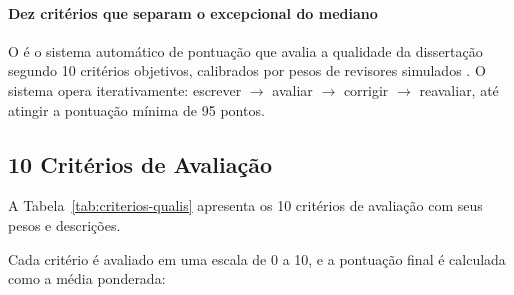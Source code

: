 \paragraph{Dez critérios que separam o excepcional do mediano} O  é o sistema automático de pontuação que
avalia a qualidade da dissertação segundo 10 critérios objetivos, calibrados
por pesos de revisores simulados \cite{opencode2026ecosystem}. O sistema opera
iterativamente: escrever $\rightarrow$ avaliar $\rightarrow$ corrigir
$\rightarrow$ reavaliar, até atingir a pontuação mínima de 95 pontos.

\subsection{10 Critérios de Avaliação}

A Tabela~\ref{tab:criterios-qualis} apresenta os 10 critérios de avaliação
com seus pesos e descrições.

\begin{table}[htb]
\centering
    \small
\caption{Critérios de avaliação do AUTO\_SCORE\_QUALIS}
\label{tab:criterios-qualis}
\end{table}

Cada critério é avaliado em uma escala de 0 a 10, e a pontuação final é
calculada como a média ponderada:

